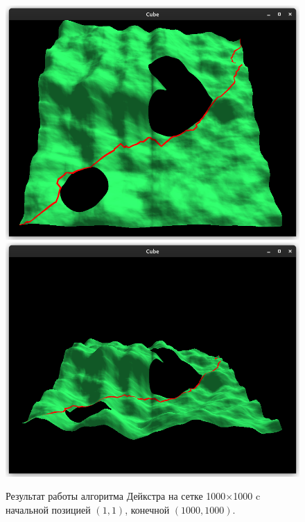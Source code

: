 \begin{figure}[h]
    \centering
    \includegraphics[scale=0.5]{content/dijkstra-top.png}
    \includegraphics[scale=0.5]{content/dijkstra.png}
    \caption{Результат работы алгоритма Дейкстра на сетке 1000$\times$1000 c начальной позицией $(1, 1)$, конечной $(1000, 1000)$.}
\end{figure}

